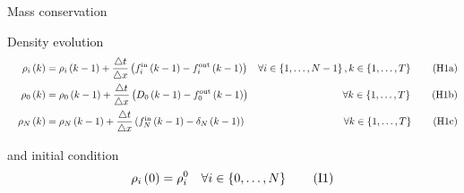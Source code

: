 \documentclass[xcolor=svgnames, english, smaller]{beamer}
\theoremstyle{plain}
\theoremstyle{definition}
\theoremstyle{plain}
\theoremstyle{plain}
\newcommand \Fontvi{\fontsize{8}{8}\selectfont}
\newcommand \systemDiagOffset{-1.8in}
\newcommand \systemDiagResizeMult{1.3}
\begin{document}
\begin{frame}{Mass conservation}

\Fontvi

\begin{figure}[t]
\hspace{\systemDiagOffset}
\resizebox{\systemDiagResizeMult\columnwidth}{!}{}
\label{fig:system}
\end{figure}

Density evolution
\begin{subequations}
\begin{align}
&& \rho_{i}\left(k\right) & =\rho_{i}\left(k-1\right)+\frac{\triangle t}{\triangle x}\left(f_{i}^{\text{in}}\left(k-1\right)-f_{i}^{\text{out}}\left(k-1\right)\right) & \forall i\in\left\{ 1,\ldots,N-1\right\} ,k\in\left\{ 1,\ldots,T\right\}
\tag{H1a}
\label{eq:conservation1}
\\
&& \rho_{0}\left(k\right) & =\rho_{0}\left(k-1\right)+\frac{\triangle t}{\triangle x}\left(D_{0}\left(k-1\right)-f_{0}^{\text{out}}\left(k-1\right)\right) & \forall k\in\left\{ 1,\ldots,T\right\}
\tag{H1b}
\label{eq:conservation2}
\\
&& \rho_{N}\left(k\right) & =\rho_{N}\left(k-1\right)+\frac{\triangle t}{\triangle x}\left(\mbox{\ensuremath{f_{N}^{\text{in}}\left(k-1\right)}}-\delta_{N}\left(k-1\right)\right) & \forall k\in\left\{ 1,\ldots,T\right\}
\tag{H1c}
\label{eq:conservation3}
\end{align}
\label{eq:conservation}
\end{subequations}

and initial condition 
\begin{align}
\rho_{i}\left(0\right) =\rho_{i}^{0} && \forall i\in\left\{ 0,\ldots,N\right\}
\tag{I1}
\label{eq:densityInit}
\end{align}


\end{frame}
\end{document}
